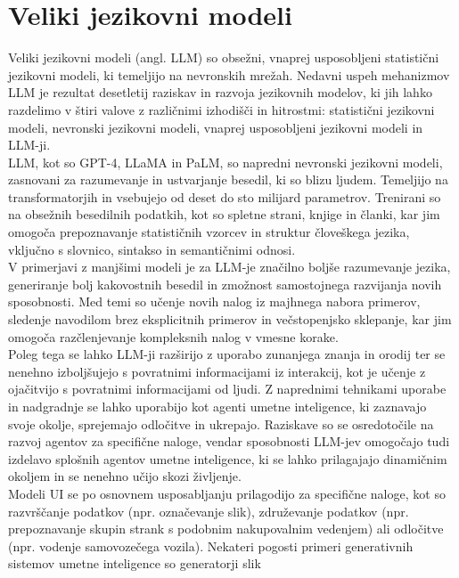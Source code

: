 \documentclass[a4paper,12pt,openright]{book}
\begin{document}
\section{Veliki jezikovni modeli}
Veliki jezikovni modeli (angl. LLM) so obsežni, vnaprej usposobljeni statistični jezikovni modeli, ki temeljijo na nevronskih mrežah. Nedavni uspeh mehanizmov LLM je rezultat desetletij raziskav in razvoja jezikovnih modelov, ki jih lahko razdelimo v štiri valove z različnimi izhodišči in hitrostmi: statistični jezikovni modeli, nevronski jezikovni modeli, vnaprej usposobljeni jezikovni modeli in LLM-ji.\cite{minaee2024largelanguagemodelssurvey} \\
LLM, kot so GPT-4, LLaMA in PaLM, so napredni nevronski jezikovni modeli, zasnovani za razumevanje in ustvarjanje besedil, ki so blizu ljudem. Temeljijo na transformatorjih in vsebujejo od deset do sto milijard parametrov. Trenirani so na obsežnih besedilnih podatkih, kot so spletne strani, knjige in članki, kar jim omogoča prepoznavanje statističnih vzorcev in struktur človeškega jezika, vključno s slovnico, sintakso in semantičnimi odnosi.\cite{10.1145/3520312.3534862} \\
V primerjavi z manjšimi modeli je za LLM-je značilno boljše razumevanje jezika, generiranje bolj kakovostnih besedil in zmožnost samostojnega razvijanja novih sposobnosti. Med temi so učenje novih nalog iz majhnega nabora primerov, sledenje navodilom brez eksplicitnih primerov in večstopenjsko sklepanje, kar jim omogoča razčlenjevanje kompleksnih nalog v vmesne korake. \cite{minaee2024largelanguagemodelssurvey} \\
Poleg tega se lahko LLM-ji razširijo z uporabo zunanjega znanja in orodij ter se nenehno izboljšujejo s povratnimi informacijami iz interakcij, kot je učenje z ojačitvijo s povratnimi informacijami od ljudi. Z naprednimi tehnikami uporabe in nadgradnje se lahko uporabijo kot agenti umetne inteligence, ki zaznavajo svoje okolje, sprejemajo odločitve in ukrepajo. Raziskave so se osredotočile na razvoj agentov za specifične naloge, vendar sposobnosti LLM-jev omogočajo tudi izdelavo splošnih agentov umetne inteligence, ki se lahko prilagajajo dinamičnim okoljem in se nenehno učijo skozi življenje.
\cite{minaee2024largelanguagemodelssurvey} \\
Modeli UI se po osnovnem usposabljanju prilagodijo za specifične naloge, kot so razvrščanje podatkov (npr. označevanje slik), združevanje podatkov (npr. prepoznavanje skupin strank s podobnim nakupovalnim vedenjem) ali
odločitve (npr. vodenje samovozečega vozila). Nekateri pogosti primeri generativnih sistemov umetne inteligence so generatorji slik
\end{document}
